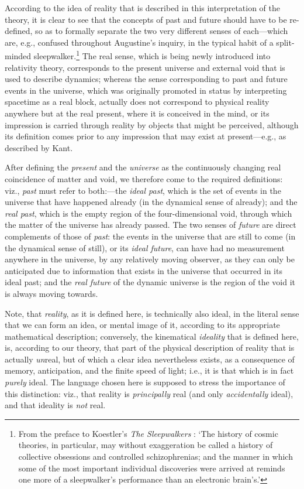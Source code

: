 According to the idea of reality that is described in this interpretation of the theory, it is clear to see that the concepts of past and future should have to be re-defined, so as to formally separate the two very different senses of each---which are, e.g., confused throughout Augustine's inquiry, in the typical habit of a split-minded sleepwalker.\footnote{From the preface to Koestler's \textit{The Sleepwalkers} \cite{Koestler1959}: `The history of cosmic theories, in particular, may without exaggeration be called a history of collective obsessions and controlled schizophrenias; and the manner in which some of the most important individual discoveries were arrived at reminds one more of a sleepwalker's performance than an electronic brain's.'} The real sense, which is being newly introduced into relativity theory, corresponds to the present universe and external void that is used to describe dynamics; whereas the sense corresponding to past and future events in the universe, which was originally promoted in status by interpreting spacetime as a real block, actually does not correspond to physical reality anywhere but at the real present, where it is conceived in the mind, or its impression is carried through reality by objects that might be perceived, although its definition comes prior to any impression that may exist at present---e.g., as described by Kant. 

After defining the \textit{present} and the \textit{universe} as the continuously changing real coincidence of matter and void, we therefore come to the required definitions: viz., \textit{past} must refer to both:---the \textit{ideal past}, which is the set of events in the universe that have happened already (in the dynamical sense of already); and the \textit{real past}, which is the empty region of the four-dimensional void, through which the matter of the universe has already passed. The two senses of \textit{future} are direct complements of those of \textit{past}: the events in the universe that are still to come (in the dynamical sense of still), or its \textit{ideal future}, can have had no measurement anywhere in the universe, by any relatively moving observer, as they can only be anticipated due to information that exists in the universe that occurred in its ideal past; and the \textit{real future} of the dynamic universe is the region of the void it is always moving towards.

Note, that \textit{reality}, as it is defined here, is technically also ideal, in the literal sense that we can form an idea, or mental image of it, according to its appropriate mathematical description; conversely, the kinematical \textit{ideality} that is defined here, is, according to our theory, that part of the physical description of reality that is actually \textit{un}real, but of which a clear idea nevertheless exists, as a consequence of memory, anticipation, and the finite speed of light; i.e., it is that which is in fact \textit{purely} ideal. The language chosen here is supposed to stress the importance of this distinction: viz., that reality is \textit{principally} real (and only \textit{accidentally} ideal), and that ideality is \textit{not} real.


